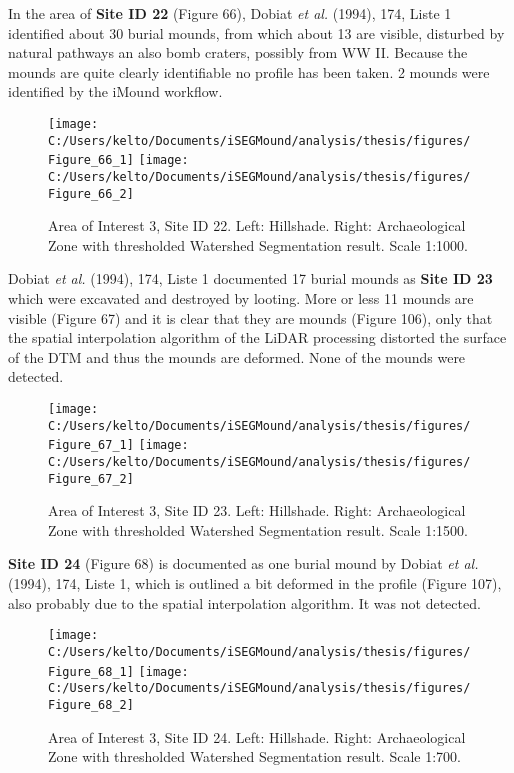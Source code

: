 \documentclass[
  12pt,
]{article}
\begin{document}
In the area of \textbf{Site ID 22} (Figure 66), Dobiat \emph{et al.} (1994), 174, Liste 1 identified about 30 burial mounds, from which about 13 are visible, disturbed by natural pathways an also bomb craters, possibly from WW II. Because the mounds are quite clearly identifiable no profile has been taken. 2 mounds were identified by the iMound workflow.

\begin{figure}
\texttt{[image: C:/Users/kelto/Documents/iSEGMound/analysis/thesis/figures/Figure\_66\_1]} \texttt{[image: C:/Users/kelto/Documents/iSEGMound/analysis/thesis/figures/Figure\_66\_2]} \caption{Area of Interest 3, Site ID 22. Left: Hillshade. Right: Archaeological Zone with thresholded Watershed Segmentation result. Scale 1:1000.}\label{fig:Figure66}
\end{figure}

Dobiat \emph{et al.} (1994), 174, Liste 1 documented 17 burial mounds as \textbf{Site ID 23} which were excavated and destroyed by looting. More or less 11 mounds are visible (Figure 67) and it is clear that they are mounds (Figure 106), only that the spatial interpolation algorithm of the LiDAR processing distorted the surface of the DTM and thus the mounds are deformed. None of the mounds were detected.

\begin{figure}
\texttt{[image: C:/Users/kelto/Documents/iSEGMound/analysis/thesis/figures/Figure\_67\_1]} \texttt{[image: C:/Users/kelto/Documents/iSEGMound/analysis/thesis/figures/Figure\_67\_2]} \caption{Area of Interest 3, Site ID 23. Left: Hillshade. Right: Archaeological Zone with thresholded Watershed Segmentation result. Scale 1:1500.}\label{fig:Figure67}
\end{figure}

\textbf{Site ID 24} (Figure 68) is documented as one burial mound by Dobiat \emph{et al.} (1994), 174, Liste 1, which is outlined a bit deformed in the profile (Figure 107), also probably due to the spatial interpolation algorithm. It was not detected.

\begin{figure}
\texttt{[image: C:/Users/kelto/Documents/iSEGMound/analysis/thesis/figures/Figure\_68\_1]} \texttt{[image: C:/Users/kelto/Documents/iSEGMound/analysis/thesis/figures/Figure\_68\_2]} \caption{Area of Interest 3, Site ID 24. Left: Hillshade. Right: Archaeological Zone with thresholded Watershed Segmentation result. Scale 1:700.}\label{fig:Figure68}
\end{figure}
\end{document}
